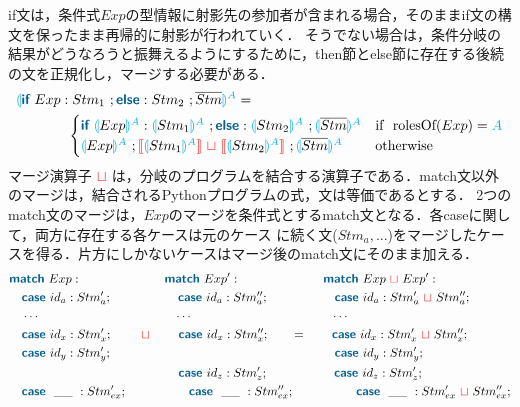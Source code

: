 \documentclass{thesis}
\newcommand{\projection}[2]{{\color{cyan}\llparenthesis}#1{\color{cyan}\rrparenthesis^#2}}
\newcommand{\mblue}[1]{\textbf{\textsf{\color{MidnightBlue}#1}}}
\newcommand{\cyan}[1]{\color{cyan}#1}
\newcommand{\nl}[1]{{\color{red}{\llbracket}}#1{\color{red}{\rrbracket}}} %
\newcommand{\mg}{~{\color{red}{\sqcup}}~} %
\begin{document}
if文は，条件式$Exp$の型情報に射影先の参加者が含まれる場合，そのままif文の構文を保ったまま再帰的に射影が行われていく．
そうでない場合は，条件分岐の結果がどうなろうと振舞えるようにするために，then節とelse節に存在する後続の文を正規化し，マージする必要がある．%
\begin{alignat*}{2} 
  &\projection{\mblue{if}~Exp:Stm_1~;\mblue{else}:Stm_2 ~;\overline{Stm}}{A}=\\
  &
  ~~~~~~~~~~~\begin{cases}
    \mblue{if}~\projection{Exp}{A} : \projection{Stm_1}{A} ~; \mblue{else}:\projection{Stm_2}{A} ~;\projection{\overline{Stm}}{A} & \text{if}~~ \text{rolesOf}(Exp) = \cyan{A}\\
    \projection{Exp}{A} ~; \nl{\projection{Stm_1}{A}} \mg \nl{\projection{Stm_2}{A}} ~;\projection{\overline{Stm}}{A} & \text{otherwise}
  \end{cases}\\
\end{alignat*}
マージ演算子$\mg$は，分岐のプログラムを結合する演算子である．\textsf{match}文以外のマージは，結合されるPythonプログラムの式，文は等価であるとする．
2つのmatch文のマージは，$Exp$のマージを条件式とするmatch文となる．各caseに関して，両方に存在する各ケースは元のケース
に続く文($Stm_a,...$)をマージしたケースを得る．片方にしかないケースはマージ後のmatch文にそのまま加える．
\begin{alignat*}{2} 
  & \mblue{match}~Exp: ~~~~~~~~~~~~~~~~~~~~\mblue{match}~Exp': ~~~~~~~~~~~~~~~~~~~~\mblue{match}~Exp \mg Exp':\\
  & ~~~\mblue{case}~id_a : Stm'_a; ~~~~~~~~~~~~~~~~\mblue{case}~id_a : Stm''_a; ~~~~~~~~~~~~~~~~\mblue{case}~id_a : Stm'_a \mg Stm''_a;\\
  & ~~~\cdots ~~~~~~~~~~~~~~~~~~~~~~~~~~~~~~~~~\cdots ~~~~~~~~~~~~~~~~~~~~~~~~~~~~~~~~~~\cdots\\
  & ~~~\mblue{case}~id_x : Stm'_x; ~~~~~~\mg~~~~~~\mblue{case}~id_x : Stm''_x; ~~~~~~=~~~~~~\mblue{case}~id_x : Stm'_x \mg Stm''_x;\\
  & ~~~\mblue{case}~id_y : Stm'_y; ~~~~~~~~~~~~~~~~~~~~~~~~~~~~~~~~~~~~~~~~~~~~~~~~~~~~~~\mblue{case}~id_y : Stm'_y; \\
  & ~~~~~~~~~~~~~~~~~~~~~~~~~~~~~~~~~~~~~~~~~\mblue{case}~id_z : Stm'_z;~~~~~~~~~~~~~~~~\mblue{case}~id_z : Stm'_z;\\
  & ~~~\mblue{case}~~\_\_ ~: Stm'_{ex}; ~~~~~~~~~~~~~~~\mblue{case}~~\_\_ ~: Stm''_{ex}; ~~~~~~~~~~~~~~~\mblue{case}~~\_\_ ~:Stm'_{ex} \mg Stm''_{ex};\\
\end{alignat*}
\end{document}
